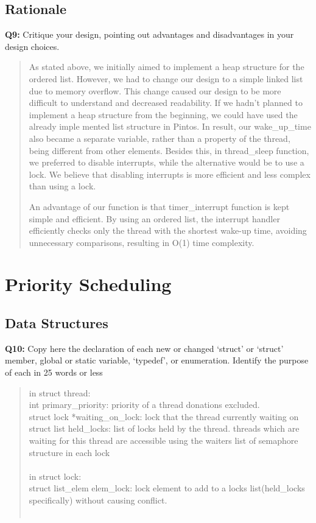 \documentclass[a4paper,11pt]{paper}
\begin{document}
\subsection{Rationale}

\textbf{Q9:} Critique your design, pointing out advantages and disadvantages in your design choices.
\begin{quote}
As stated above, we initially aimed to implement a heap structure for the ordered list. However, we had to change our design to a simple linked list due to memory overflow. This change caused our design to be more difficult to understand and decreased readability. If we hadn't planned to implement a heap structure from the beginning, we could have used the already imple
mented list structure in Pintos. In result, our wake\_up\_time also became a 
separate variable, rather than a property of the thread, being different from
other elements.
Besides this, in thread\_sleep function, we preferred to disable interrupts,
while the alternative would be to use a lock. We believe that disabling
interrupts is more efficient and less complex than using a lock.

An advantage of our function is that timer\_interrupt function is kept simple
and efficient. By using an ordered list, the interrupt handler efficiently
checks only the thread with the shortest wake-up time, avoiding unnecessary
comparisons, resulting in O(1) time complexity.
\end{quote}




\section{Priority Scheduling}

\subsection{Data Structures}

\textbf{Q10:} Copy here the declaration of each new or changed `struct' or `struct' member, global or static variable, `typedef', or enumeration.  Identify the purpose of each in 25 words or less
\begin{quote}
in struct thread:\\
int primary\_priority: priority of a thread donations excluded.\\
struct lock *waiting\_on\_lock: lock that the thread currently waiting on\\
struct list held\_locks:  list of locks held by the thread. threads which are waiting for this thread are accessible using the waiters list of semaphore structure in each lock\\
\\
in struct lock:\\
struct list\_elem elem\_lock: lock element to add to a locks list(held\_locks specifically) without causing conflict.\\
\\
\end{quote}
\end{document}
